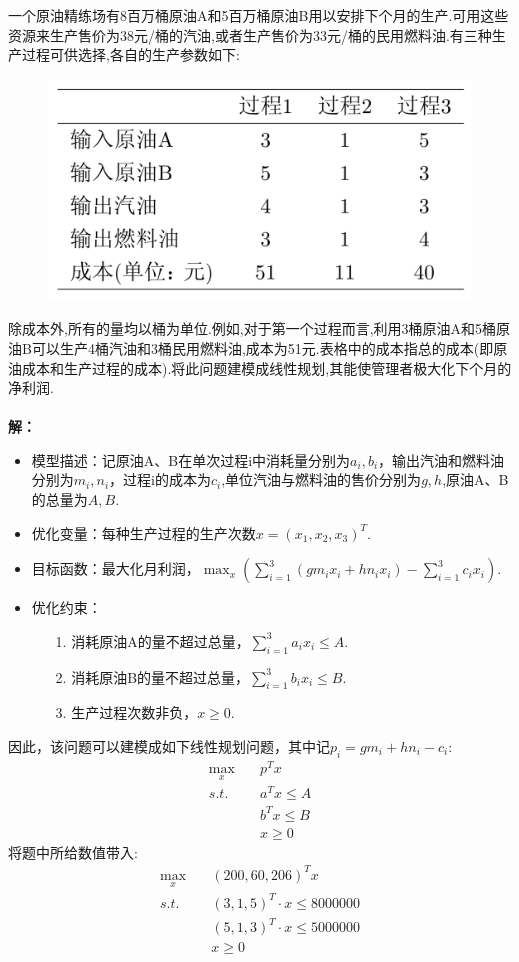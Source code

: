 \documentclass[10pt]{article}
\begin{document}
一个原油精练场有8百万桶原油A和5百万桶原油B用以安排下个月的生产.可用这些资源来生产售价为38元/桶的汽油,或者生产售价为33元/桶的民用燃料油.有三种生产过程可供选择,各自的生产参数如下:
\begin{figure}[ht]
	\centering
	\includegraphics[width=0.5\linewidth]{prob1.png}
	\label{fig.prob1}
\end{figure}
除成本外,所有的量均以桶为单位.例如,对于第一个过程而言,利用3桶原油A和5桶原油B可以生产4桶汽油和3桶民用燃料油,成本为51元.表格中的成本指总的成本(即原油成本和生产过程的成本).将此问题建模成线性规划,其能使管理者极大化下个月的净利润.\\\\
\Large{\textbf{解：}}
\begin{itemize}
\item 模型描述：记原油A、B在单次过程i中消耗量分别为$a_i,b_i$，输出汽油和燃料油分别为$m_i,n_i$，过程i的成本为$c_i$,单位汽油与燃料油的售价分别为$g,h$,原油A、B的总量为$A,B$.
\item 优化变量：每种生产过程的生产次数$x=(x_1,x_2,x_3)^T$.
\item 目标函数：最大化月利润，$\max_x\left(\sum_{i=1}^3(gm_ix_i + hn_ix_i)-\sum_{i=1}^3c_ix_i\right)$.
\item 优化约束：
\begin{itemize}
\item [1.] 消耗原油A的量不超过总量，$\sum_{i=1}^3 a_ix_i \le A$.
\item [2.] 消耗原油B的量不超过总量，$\sum_{i=1}^3 b_ix_i \le B$.
\item [3.] 生产过程次数非负，$x\ge0$.
\end{itemize}
\end{itemize}
因此，该问题可以建模成如下线性规划问题，其中记$p_i=gm_i+hn_i-c_i$:
	\begin{equation}
	\begin{aligned}
		\max_{x}\quad &p^Tx\\
		s.t.\quad            &a^Tx\le A   \\
							 &b^Tx\le B\\
							 &x\ge0 
	\end{aligned}
	\end{equation}
将题中所给数值带入:
	\begin{equation}
	\begin{aligned}
		\max_{x}\quad &(200,60,206)^Tx\\
		s.t.\quad            &(3,1,5)^T\cdot x\le 8000000   \\
							 &(5,1,3)^T\cdot x\le 5000000\\
							 &x\ge0 
	\end{aligned}
	\end{equation}
\end{document}
